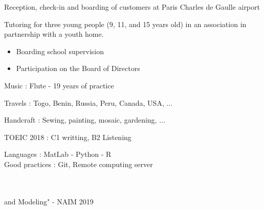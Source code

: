 




   Reception, check-in and boarding of customers at Paris Charles de Gaulle airport

\divider

Tutoring for three young people (9, 11, and 15 years old) in an association in
partnership with a youth home.

\divider

\begin{itemize}
\item Boarding school supervision
\item Participation on the Board of Directors
\end{itemize}



{\large\color{emphasis} \faMusic \vspace{0.2cm}  Music : } 
    Flute - 19 years of practice\\
  \vspace{0.5cm}

{\large\color{emphasis} \faGlobe \vspace{0.2cm} Travels : }  
    Togo, Benin, Russia, Peru, Canada, USA, ...\\
  \vspace{0.5cm}
  
{\large\color{emphasis} \faCut  \vspace{0.2cm} Handcraft : }
    Sewing, painting, mosaic, gardening, ...


TOEIC 2018 : C1 writting, B2 Listening



Languages : MatLab - Python  - R\\
Good practices : Git, Remote computing server

\vspace{0.5cm}

\vspace{0.5cm}

 \\
 \\ \hspace{0.5cm} and Modeling" - NAIM 2019
    
